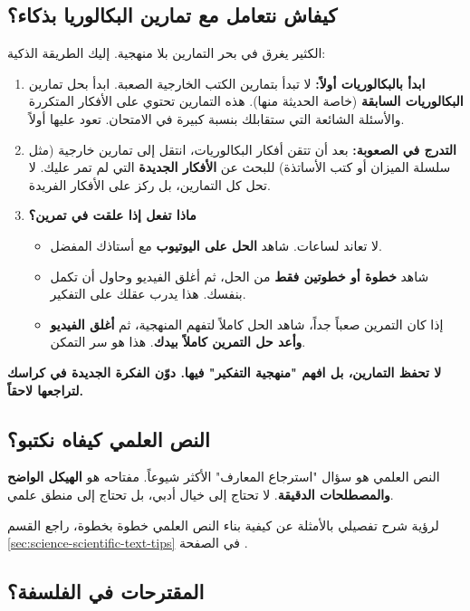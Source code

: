 \documentclass[12pt,a4paper]{book}
\newcommand{\importantAr}[1]{%
	\begin{important}
		\bfseries #1
	\end{important}
}
\begin{document}
	\subsection*{كيفاش نتعامل مع تمارين البكالوريا بذكاء؟}
	\label{sec:smart-exercise-solving}
	
	الكثير يغرق في بحر التمارين بلا منهجية. إليك الطريقة الذكية:
	
	\begin{enumerate}
		\item \textbf{ابدأ بالبكالوريات أولاً:} لا تبدأ بتمارين الكتب الخارجية الصعبة. ابدأ بحل تمارين \textbf{البكالوريات السابقة} (خاصة الحديثة منها). هذه التمارين تحتوي على الأفكار المتكررة والأسئلة الشائعة التي ستقابلك بنسبة كبيرة في الامتحان. تعود عليها أولاً.
		\item \textbf{التدرج في الصعوبة:} بعد أن تتقن أفكار البكالوريات، انتقل إلى تمارين خارجية (مثل سلسلة الميزان أو كتب الأساتذة) للبحث عن \textbf{الأفكار الجديدة} التي لم تمر عليك. لا تحل كل التمارين، بل ركز على الأفكار الفريدة.
		\item \textbf{ماذا تفعل إذا علقت في تمرين؟}
		\begin{itemize}
			\item لا تعاند لساعات. شاهد \textbf{الحل على اليوتيوب} مع أستاذك المفضل.
			\item شاهد \textbf{خطوة أو خطوتين فقط} من الحل، ثم أغلق الفيديو وحاول أن تكمل بنفسك. هذا يدرب عقلك على التفكير.
			\item إذا كان التمرين صعباً جداً، شاهد الحل كاملاً لتفهم المنهجية، ثم \textbf{أغلق الفيديو وأعد حل التمرين كاملاً بيدك}. هذا هو سر التمكن.
		\end{itemize}
	\end{enumerate}
	\importantAr{لا تحفظ التمارين، بل افهم "منهجية التفكير" فيها. دوّن الفكرة الجديدة في كراسك لتراجعها لاحقاً.}
	
	\subsection*{النص العلمي كيفاه نكتبو؟}
	
	النص العلمي هو سؤال "استرجاع المعارف" الأكثر شيوعاً. مفتاحه هو \textbf{الهيكل الواضح والمصطلحات الدقيقة}. لا تحتاج إلى خيال أدبي، بل تحتاج إلى منطق علمي.
	
	لرؤية شرح تفصيلي بالأمثلة عن كيفية بناء النص العلمي خطوة بخطوة، راجع القسم \ref{sec:science-scientific-text-tips} في الصفحة \pageref{sec:science-scientific-text-tips}.
	
		\subsection*{المقترحات في الفلسفة؟}
		
\end{document}

